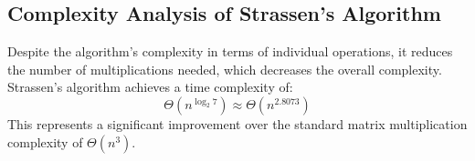     \subsection{Complexity Analysis of Strassen's Algorithm}
    Despite the algorithm's complexity in terms of individual operations, it reduces the number of multiplications needed, which decreases the overall complexity. Strassen's algorithm achieves a time complexity of:
    \[
    \Theta(n^{\log_2 7}) \approx \Theta(n^{2.8073})
    \]
    This represents a significant improvement over the standard matrix multiplication complexity of \(\Theta(n^3)\).
